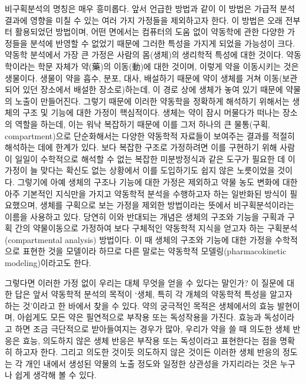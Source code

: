 \documentclass[
  11pt,
  krantz2, a4paper, twoside]{krantz}
\theoremstyle{definition}
\theoremstyle{definition}
\theoremstyle{definition}
\theoremstyle{definition}
\theoremstyle{remark}
\begin{document}
비구획분석의 명칭은 매우 흥미롭다.
앞서 언급한 방법과 같이 이 방법은 가급적 분석결과에 영향을 미칠 수 있는 여러 가지 가정들을 제외하고자 한다.
이 방법은 오래 전부터 활용되었던 방법이며, 어떤 면에서는 컴퓨터의 도움 없이 약동학에 관한 다양한 가정들을 분석에 반영할 수 없었기 때문에 그러한 특성을 가지게 되었을 가능성이 크다.
약동학 분석에서 가장 큰 가정은 사람의 몸(생체)의 생리학적 특성에 대한 것이다. 
약동학이라는 학문 자체가 약(藥)의 이동(動)에 대한 것이며, 이렇게 약을 이동시키는 것은 생물이다. 
생물이 약을 흡수, 분포, 대사, 배설하기 때문에 약이 생체를 거쳐 이동(보관되어 있던 장소에서 배설한 장소로)하는데, 이 경로 상에 생체가 놓여 있기 때문에 약물의 노출이 만들어진다.
그렇기 때문에 이러한 약동학을 정확하게 해석하기 위해서는 생체의 구조 및 기능에 대한 가정이 핵심적이다. 
생체는 약이 잠시 머물다가 떠나는 장소의 역할을 하는데, 이는 워낙 복잡하기 때문에 이를 그저 하나의 큰 물통(구획, compartment)으로 단순화해서는 다양한 약동학적 자료들이 보여주는 결과를 적절히 해석하는 데에 한계가 있다. 
보다 복잡한 구조로 가정하려면 이를 구현하기 위해 사람이 일일이 수학적으로 해석할 수 없는 복잡한 미분방정식과 같은 도구가 필요한 데 이 가정이 늘 맞다는 확신도 없는 상황에서 이를 도입하기도 쉽지 않은 노릇이었을 것이다.
그렇기에 아예 생체의 구조나 기능에 대한 가정은 제외하고 약물 농도 변화에 대한 아주 기본적인 지식만을 가지고 약동학적 분석을 수행하고자 하는 일반화된 방식이 필요했으며, 생체를 구획으로 보는 가정을 제외한 방법이라는 뜻에서 비구획분석이라는 이름을 사용하고 있다. 
당연히 이와 반대되는 개념은 생체의 구조와 기능을 구획과 구획 간의 약물이동으로 가정하여 보다 구체적인 약동학적 지식을 얻고자 하는 구획분석(compartmental analysis) 방법이다.
이 때 생체의 구조와 기능에 대한 가정을 수학적으로 표현한 것을 모델이라 하므로 다른 말로는 약동학적 모델링(pharmacokinetic modeling)이라고도 한다.

그렇다면 이러한 가정 없이 우리는 대체 무엇을 얻을 수 있다는 말인가?
이 질문에 대한 답은 앞서 약동학적 분석의 목적이 `생체, 특히 각 개체의 약동학적 특성을 알고자 하는 것'이라고 한 바에서 찾을 수 있다. 
약의 궁극적인 목적은 생체에서의 효능 발현이며, 아쉽게도 모든 약은 필연적으로 부작용 또는 독성작용을 가진다.
효능과 독성이라고 하면 조금 극단적으로 받아들여지는 경우가 많아, 우리가 약을 쓸 때 의도한 생체 반응은 효능, 의도하지 않은 생체 반응은 부작용 또는 독성이라고 표현한다는 점을 명확히 하고자 한다.
그리고 의도한 것이듯 의도하지 않은 것이든 이러한 생체 반응의 정도는 각 개인 내에서 생성된 약물의 노출 정도와 일정한 상관성을 가지리라는 것은 누구나 쉽게 생각해 볼 수 있다.
\end{document}
